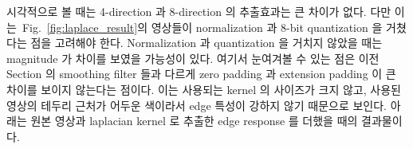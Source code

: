 \documentclass[a4paper, 12p]{paper}
\begin{document}
시각적으로 볼 때는 4-direction 과 8-direction 의 추출효과는 큰 차이가 없다. 다만 이는~Fig.~\ref{fig:laplace_result}의 영상들이 normalization 과 8-bit quantization 을 거쳤다는 점을 고려해야 한다. Normalization 과 quantization 을 거치지 않았을 때는 magnitude 가 차이를 보였을 가능성이 있다. 여기서 눈여겨볼 수 있는 점은 이전 Section 의 smoothing filter 들과 다르게 zero padding 과 extension padding 이 큰 차이를 보이지 않는다는 점이다. 이는 사용되는 kernel 의 사이즈가 크지 않고, 사용된 영상의 테두리 근처가 어두운 색이라서 edge 특성이 강하지 않기 때문으로 보인다. 아래는 원본 영상과 laplacian kernel 로 추출한 edge response 를 더했을 때의 결과물이다.

\begin{figure}[hbtp]
\centering
{}
\subfigure[4 direction]{
}
\end{figure}
\end{document}
